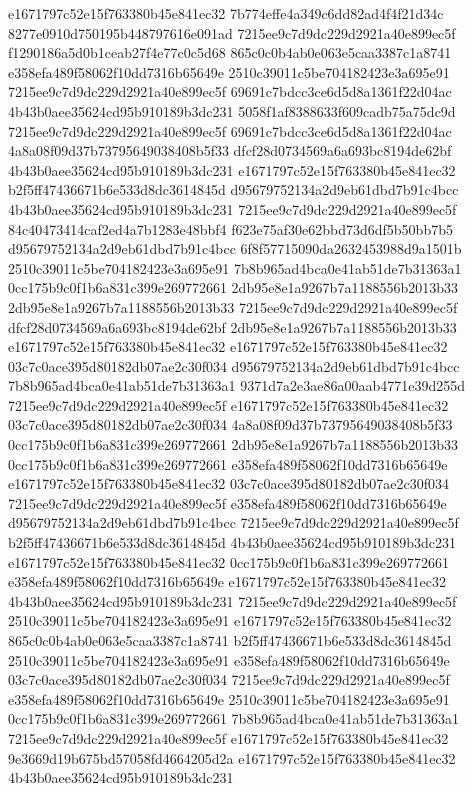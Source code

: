e1671797c52e15f763380b45e841ec32
7b774effe4a349c6dd82ad4f4f21d34c
8277e0910d750195b448797616e091ad
7215ee9c7d9dc229d2921a40e899ec5f
f1290186a5d0b1ceab27f4e77c0c5d68
865c0c0b4ab0e063e5caa3387c1a8741
e358efa489f58062f10dd7316b65649e
2510c39011c5be704182423e3a695e91
7215ee9c7d9dc229d2921a40e899ec5f
69691c7bdcc3ce6d5d8a1361f22d04ac
4b43b0aee35624cd95b910189b3dc231
5058f1af8388633f609cadb75a75dc9d
7215ee9c7d9dc229d2921a40e899ec5f
69691c7bdcc3ce6d5d8a1361f22d04ac
4a8a08f09d37b73795649038408b5f33
dfcf28d0734569a6a693bc8194de62bf
4b43b0aee35624cd95b910189b3dc231
e1671797c52e15f763380b45e841ec32
b2f5ff47436671b6e533d8dc3614845d
d95679752134a2d9eb61dbd7b91c4bcc
4b43b0aee35624cd95b910189b3dc231
7215ee9c7d9dc229d2921a40e899ec5f
84c40473414caf2ed4a7b1283e48bbf4
f623e75af30e62bbd73d6df5b50bb7b5
d95679752134a2d9eb61dbd7b91c4bcc
6f8f57715090da2632453988d9a1501b
2510c39011c5be704182423e3a695e91
7b8b965ad4bca0e41ab51de7b31363a1
0cc175b9c0f1b6a831c399e269772661
2db95e8e1a9267b7a1188556b2013b33
2db95e8e1a9267b7a1188556b2013b33
7215ee9c7d9dc229d2921a40e899ec5f
dfcf28d0734569a6a693bc8194de62bf
2db95e8e1a9267b7a1188556b2013b33
e1671797c52e15f763380b45e841ec32
e1671797c52e15f763380b45e841ec32
03c7c0ace395d80182db07ae2c30f034
d95679752134a2d9eb61dbd7b91c4bcc
7b8b965ad4bca0e41ab51de7b31363a1
9371d7a2e3ae86a00aab4771e39d255d
7215ee9c7d9dc229d2921a40e899ec5f
e1671797c52e15f763380b45e841ec32
03c7c0ace395d80182db07ae2c30f034
4a8a08f09d37b73795649038408b5f33
0cc175b9c0f1b6a831c399e269772661
2db95e8e1a9267b7a1188556b2013b33
0cc175b9c0f1b6a831c399e269772661
e358efa489f58062f10dd7316b65649e
e1671797c52e15f763380b45e841ec32
03c7c0ace395d80182db07ae2c30f034
7215ee9c7d9dc229d2921a40e899ec5f
e358efa489f58062f10dd7316b65649e
d95679752134a2d9eb61dbd7b91c4bcc
7215ee9c7d9dc229d2921a40e899ec5f
b2f5ff47436671b6e533d8dc3614845d
4b43b0aee35624cd95b910189b3dc231
e1671797c52e15f763380b45e841ec32
0cc175b9c0f1b6a831c399e269772661
e358efa489f58062f10dd7316b65649e
e1671797c52e15f763380b45e841ec32
4b43b0aee35624cd95b910189b3dc231
7215ee9c7d9dc229d2921a40e899ec5f
2510c39011c5be704182423e3a695e91
e1671797c52e15f763380b45e841ec32
865c0c0b4ab0e063e5caa3387c1a8741
b2f5ff47436671b6e533d8dc3614845d
2510c39011c5be704182423e3a695e91
e358efa489f58062f10dd7316b65649e
03c7c0ace395d80182db07ae2c30f034
7215ee9c7d9dc229d2921a40e899ec5f
e358efa489f58062f10dd7316b65649e
2510c39011c5be704182423e3a695e91
0cc175b9c0f1b6a831c399e269772661
7b8b965ad4bca0e41ab51de7b31363a1
7215ee9c7d9dc229d2921a40e899ec5f
e1671797c52e15f763380b45e841ec32
9e3669d19b675bd57058fd4664205d2a
e1671797c52e15f763380b45e841ec32
4b43b0aee35624cd95b910189b3dc231
